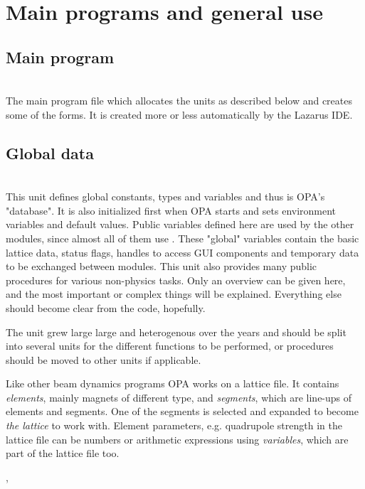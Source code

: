 \documentclass[12pt]{article}
\newcommand\code[1]{{\tt #1}}
\newcommand{\opauni}[1]{\colorbox{orange!30}{{\color{black}\code{#1}}}}
\newcommand{\ounih}[2]{\subsection{\label{#2}#1}{\Huge\opauni{#2}}\\}
\newcommand{\ouni}[1]{\hyperref[#1]{\opauni{#1}}}
\newcommand{\uses}[1]{\flushleft {\bf Uses:} #1}
\newcommand{\desc}[1]{#1}
\newcommand{\todo}[1]{{\color{red} #1}}
\begin{document}
\pagebreak

\section{\label{secglob}Main programs and general use}

\ounih{Main program}{{opa.lpr}}

\desc{The main program file which allocates the units as described below and creates some of the forms. It is created more or less automatically by the Lazarus IDE.}


\ounih{Global data}{globlib}

\desc{
This unit defines global constants, types and variables and thus is OPA's "database". It is also initialized first when OPA starts and sets environment variables and default values. Public variables defined here are used by the other modules, since almost all of them use \ouni{globlib}. These "global" variables contain the basic lattice data, status flags, handles to access GUI components and temporary data to be exchanged between modules. This unit also provides many public procedures for various non-physics tasks. Only an overview can be given here, and the most important or complex things will be explained. Everything else should become clear from the code, hopefully.

\todo{The \ouni{globlib} unit grew large large and heterogenous over the years and should be split into several units for the different functions to be performed, or procedures should be moved to other units if applicable.}

Like other beam dynamics programs OPA works on a lattice file. It contains {\em elements}, mainly magnets of different type, and {\em segments}, which are line-ups of elements and segments. One of the segments is selected and expanded to become {\em the lattice} to work with. Element parameters, e.g. quadrupole strength in the lattice file can be numbers or arithmetic expressions using {\em variables}, which are part of the lattice file too.
}

\uses{\opauni{../com/mathlib}, \opauni{../com/asaux}}
\end{document}
